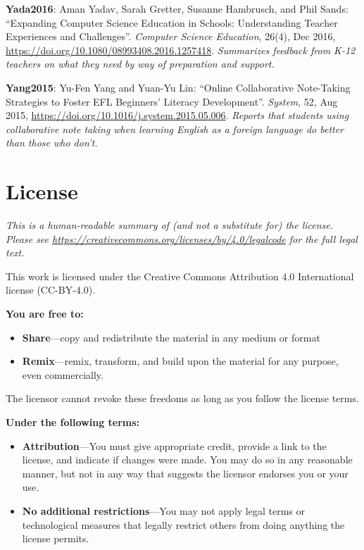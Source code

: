\textbf{\hypertarget{b:Yada2016}{Yada2016}\label{b:Yada2016}}: Aman Yadav, Sarah Gretter, Susanne Hambrusch, and Phil Sands: ``Expanding Computer Science Education in Schools: Understanding Teacher Experiences and Challenges''. \emph{Computer Science Education}, 26(4), Dec 2016, \url{https://doi.org/10.1080/08993408.2016.1257418}. \emph{Summarizes feedback from K-12 teachers on what they need by way of preparation and support.}

\textbf{\hypertarget{b:Yang2015}{Yang2015}\label{b:Yang2015}}: Yu-Fen Yang and Yuan-Yu Lin: ``Online Collaborative Note-Taking Strategies to Foster EFL Beginners' Literacy Development''. \emph{System}, 52, Aug 2015, \url{https://doi.org/10.1016/j.system.2015.05.006}. \emph{Reports that students using collaborative note taking when learning English as a foreign language do better than those who don't.}

\chapter{License}\label{s:license}

\emph{This is a human-readable summary of (and not a substitute for) the license.
Please see \url{https://creativecommons.org/licenses/by/4.0/legalcode} for the full legal text.}

This work is licensed under the Creative Commons Attribution 4.0
International license (CC-BY-4.0).

\textbf{You are free to:}

\begin{itemize}
\item
  \textbf{Share}---copy and redistribute the material in any medium or
  format
\item
  \textbf{Remix}---remix, transform, and build upon the material for any
  purpose, even commercially.
\end{itemize}

The licensor cannot revoke these freedoms as long as you follow the
license terms.

\textbf{Under the following terms:}

\begin{itemize}
\item
  \textbf{Attribution}---You must give appropriate credit, provide a link
  to the license, and indicate if changes were made. You may do so in
  any reasonable manner, but not in any way that suggests the licensor
  endorses you or your use.
\item
  \textbf{No additional restrictions}---You may not apply legal terms or
  technological measures that legally restrict others from doing
  anything the license permits.
\end{itemize}


